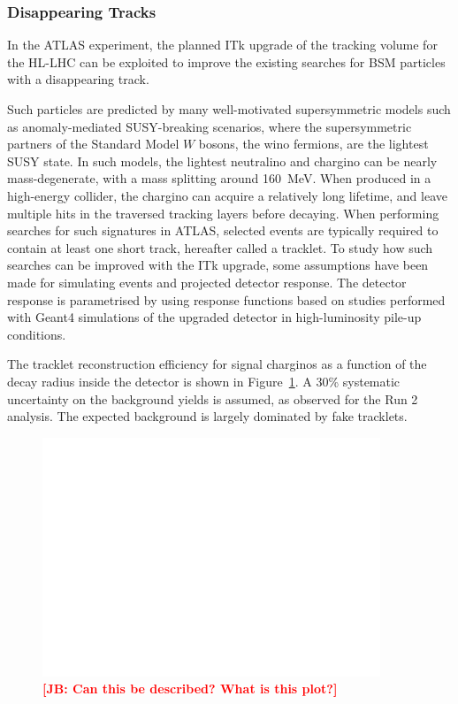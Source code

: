 \subsubsection{Disappearing Tracks}

In the ATLAS experiment, the planned ITk upgrade of the tracking volume for the HL-LHC can be exploited to improve the existing searches for BSM particles with a disappearing track.

Such particles are predicted by many well-motivated supersymmetric models such as anomaly-mediated SUSY-breaking scenarios, where the supersymmetric partners of the Standard Model $W$ bosons, the wino fermions, are the lightest SUSY state. In such models, the lightest neutralino and chargino can be nearly mass-degenerate, with a mass splitting around 160~MeV. When produced in a high-energy collider, the chargino can acquire a relatively long lifetime,%
and leave multiple hits in the traversed tracking layers before decaying. When performing searches for such signatures in ATLAS, selected events are typically required to contain at least one short track, hereafter called a tracklet. To study how such searches can be improved with the ITk upgrade, some assumptions have been made for simulating events and projected detector response. The detector response is parametrised by using response functions based on studies performed with Geant4 simulations of the upgraded detector in high-luminosity pile-up conditions.

The tracklet reconstruction efficiency for signal charginos as a function of the decay radius inside the detector is shown in Figure~\ref{fig:ATLAS_DT1}. A 30\% systematic uncertainty on the background yields is assumed, as observed for the Run 2 analysis. The expected background is largely dominated by fake tracklets. %
%
\begin{figure}[t]\begin{center}
\includegraphics[width=0.9\textwidth]{figures/ch03_fig_039.pdf}
\caption{ {\bf \textcolor{red}{[JB: Can this be described?  What is this plot?]}}
}
\label{fig:ATLAS_DT1}
\end{center}
\end{figure}

